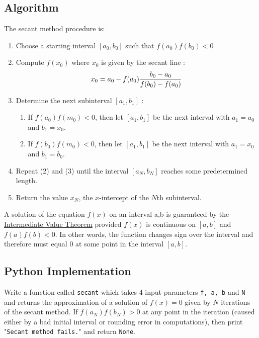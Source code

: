\documentclass[a4paper, 12pt, reqno]{article}
\begin{document}
\subsection{Algorithm}
The secant method procedure is:
\begin{enumerate}
  \item Choose a starting interval $[a_0,b_0]$ such that $f(a_0)f(b_0)<0$
  \item Compute $f(x_0)$ where $x_0$ is given by the secant line :
\begin{equation}
x_0 = a_0 - f(a_0)\frac{b_0 - a_0}{f(b_0) - f(a_0)}
\notag
\end{equation}
  \item Determine the next subinterval $[a_1,b_1]$ :
	\begin{enumerate}
       \item If $f(a_0)f(m_0)<0$, then let $[a_1,b_1]$  be the next interval with $a_1=a_0$ and $b_1=x_0$.
       \item If $f(b_0)f(m_0)<0$, then let $[a_1,b_1]$  be the next interval with $a_1=x_0$ and $b_1=b_0$.
	\end{enumerate}
\item Repeat (2) and (3) until the interval $[a_N,b_N]$ reaches some predetermined length.
\item Return the value $x_N$, the $x$-intercept of the $N$th subinterval.
\end{enumerate}
A solution of the equation $f(x)$ on an interval a,b is guaranteed by the \underline{Intermediate Value Theorem} provided $f(x)$ is continuous on $[a,b]$ and \\ $f(a)f(b)<0$. In other words, the function changes sign over the interval and therefore must equal 0 at some point in the interval $[a,b]$.

\subsection{Python Implementation}
Write a function called \texttt{secant} which takes 4 input parameters \texttt{f, a, b} and \texttt{N} and returns the approximation of a solution of $f(x)=0$ given by $N$ iterations of the secant method. If $f(a_N)f(b_N)>0$ at any point in the iteration (caused either by a bad initial interval or rounding error in computations), then print "\texttt{Secant method fails.}" and return \texttt{None}.
\end{document}
